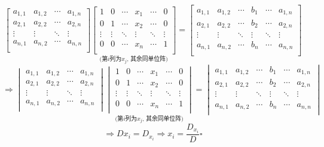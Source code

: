 \documentclass[UTF8]{ctexart}
\begin{document}
\begin{prf}
			\[\begin{bmatrix}
				a_{1,1} & a_{1,2} & \cdots & a_{1,n}\\
				a_{2,1} & a_{2,2} & \cdots & a_{2,n}\\
				\vdots & \vdots & \ddots & \vdots\\
				a_{n,1} & a_{n,2} & \cdots & a_{n,n}\\
			\end{bmatrix}
			\underset{\text{(第$i$列为$x_j$, 其余同单位阵)}}{
			\begin{bmatrix}
				1 & 0 & \cdots & x_1 & \cdots & 0\\
				0 & 1 & \cdots & x_2 & \cdots & 0\\
				\vdots & \vdots & \ddots & \vdots & \ddots & \vdots\\
				0 & 0 & \cdots & x_n & \cdots & 1\\
			\end{bmatrix}}=
			\begin{bmatrix}
				a_{1,1} & a_{1,2} & \cdots & b_1 & \cdots & a_{1,n}\\
				a_{2,1} & a_{2,2} & \cdots & b_2 & \cdots & a_{2,n}\\
				\vdots & \vdots & \ddots & \vdots & \ddots & \vdots\\
				a_{n,1} & a_{n,2} & \cdots & b_n & \cdots & a_{n,n}\\
			\end{bmatrix}\]
			\[\Longrightarrow\begin{vmatrix}
				a_{1,1} & a_{1,2} & \cdots & a_{1,n}\\
				a_{2,1} & a_{2,2} & \cdots & a_{2,n}\\
				\vdots & \vdots & \ddots & \vdots\\
				a_{n,1} & a_{n,2} & \cdots & a_{n,n}\\
			\end{vmatrix}
			\underset{\text{(第$i$列为$x_j$, 其余同单位阵)}}{
			\begin{vmatrix}
				1 & 0 & \cdots & x_1 & \cdots & 0\\
				0 & 1 & \cdots & x_2 & \cdots & 0\\
				\vdots & \vdots & \ddots & \vdots & \ddots & \vdots\\
				0 & 0 & \cdots & x_n & \cdots & 1\\
			\end{vmatrix}}=
			\begin{vmatrix}
				a_{1,1} & a_{1,2} & \cdots & b_1 & \cdots & a_{1,n}\\
				a_{2,1} & a_{2,2} & \cdots & b_2 & \cdots & a_{2,n}\\
				\vdots & \vdots & \ddots & \vdots & \ddots & \vdots\\
				a_{n,1} & a_{n,2} & \cdots & b_n & \cdots & a_{n,n}\\
			\end{vmatrix}\]
			\[\Longrightarrow Dx_i=D_{x_i}\Longrightarrow x_i=\frac{D_{x_i}}{D}\square\]
    \end{prf}
\end{document}
